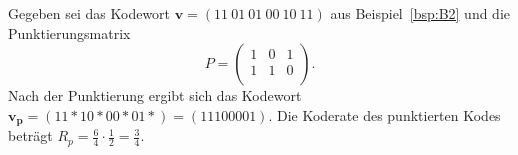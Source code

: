 \begin{beispiel}
Gegeben sei das Kodewort $\mathbf{v}=\left( 11~01~01~00~10~11\right)$ aus Beispiel~\ref{bsp:B2} und die Punktierungsmatrix
\begin{equation*}
P=
\begin{pmatrix}
1 & 0 & 1 \\
1 & 1 & 0 \\
\end{pmatrix}.
\end{equation*}
Nach der Punktierung ergibt sich das Kodewort $\mathbf{v_{p}}=\left( 11\ast 10\ast 00\ast 01\ast\right) = \left( 11100001\right)$. Die Koderate des punktierten Kodes beträgt $R_{p}=\frac{6}{4}\cdot\frac{1}{2}=\frac{3}{4}$.
\label{bsp:B6}
\end{beispiel}